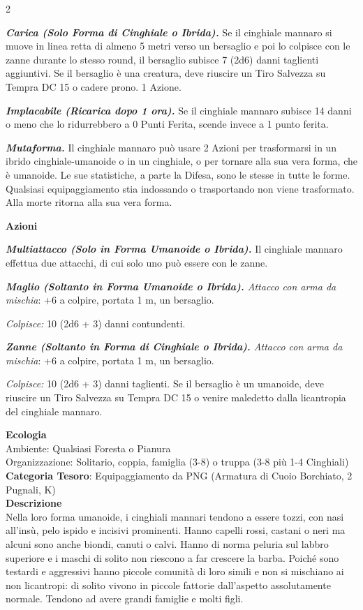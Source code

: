 \begin{multicols}{2}
{\emph{\textbf{Carica (Solo Forma di Cinghiale o Ibrida).}} Se il cinghiale mannaro si muove in linea retta di almeno 5 metri verso un bersaglio e poi lo colpisce con le zanne durante lo stesso round, il bersaglio subisce 7 (2d6) danni taglienti aggiuntivi. Se il bersaglio è una creatura, deve riuscire un Tiro Salvezza su Tempra DC 15 o cadere prono. 1 Azione.

\emph{\textbf{Implacabile (Ricarica dopo 1 ora).}} Se il cinghiale mannaro subisce 14 danni o meno che lo ridurrebbero a 0 Punti Ferita, scende invece a 1 punto ferita.

\emph{\textbf{Mutaforma.}} Il cinghiale mannaro può usare 2 Azioni per trasformarsi in un ibrido cinghiale-umanoide o in un cinghiale, o per tornare alla sua vera forma, che è umanoide. Le sue statistiche, a parte la Difesa, sono le stesse in tutte le forme. Qualsiasi equipaggiamento stia indossando o trasportando non viene trasformato. Alla morte ritorna alla sua vera forma.

\textbf{Azioni}

\emph{\textbf{Multiattacco (Solo in Forma Umanoide o Ibrida).}} Il cinghiale mannaro effettua due attacchi, di cui solo uno può essere con le zanne.

\emph{\textbf{Maglio (Soltanto in Forma Umanoide o Ibrida).} Attacco con arma da mischia}: +6 a colpire, portata 1 m, un bersaglio.

\emph{Colpisce:} 10 (2d6 + 3) danni contundenti.

\emph{\textbf{Zanne (Soltanto in Forma di Cinghiale o Ibrida).} Attacco con arma da mischia}: +6 a colpire, portata 1 m, un bersaglio.

\emph{Colpisce:} 10 (2d6 + 3) danni taglienti. Se il bersaglio è un umanoide, deve riuscire un Tiro Salvezza su Tempra DC 15 o venire maledetto dalla licantropia del cinghiale mannaro.

\textbf{Ecologia}\\
Ambiente: Qualsiasi Foresta o Pianura\\
Organizzazione: Solitario, coppia, famiglia (3-8) o truppa (3-8 più 1-4 Cinghiali)\\
\textbf{Categoria Tesoro}: Equipaggiamento da PNG (Armatura di Cuoio Borchiato, 2 Pugnali, K)\\
\textbf{Descrizione}\\
Nella loro forma umanoide, i cinghiali mannari tendono a essere tozzi, con nasi all'insù, pelo ispido e incisivi prominenti. Hanno capelli rossi, castani o neri ma alcuni sono anche biondi, canuti o calvi. Hanno di norma peluria sul labbro superiore e i maschi di solito non riescono a far crescere la barba. Poiché sono testardi e aggressivi hanno piccole comunità di loro simili e non si mischiano ai non licantropi: di solito vivono in piccole fattorie dall'aspetto assolutamente normale. Tendono ad avere grandi famiglie e molti figli.

}
\end{multicols}
